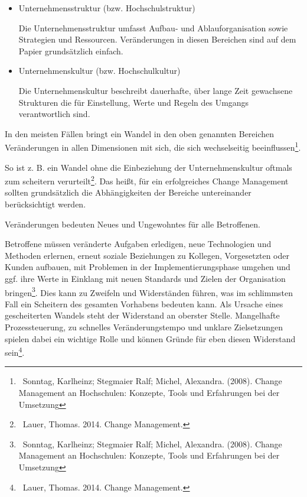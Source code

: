 \documentclass{article}
\begin{document}
\bigskip

\begin{itemize}
\item Unternehmensstruktur (bzw. Hochschulstruktur)

Die Unternehmensstruktur umfasst Aufbau- und Ablauforganisation sowie Strategien und Ressourcen. Veränderungen in diesen
Bereichen sind auf dem Papier grundsätzlich einfach.
\end{itemize}

\bigskip


\bigskip

\begin{itemize}
\item Unternehmenskultur (bzw. Hochschulkultur) 

Die Unternehmenskultur beschreibt dauerhafte, über lange Zeit gewachsene Strukturen die für Einstellung, Werte und
Regeln des Umgangs verantwortlich sind. 


\bigskip
\end{itemize}
In den meisten Fällen bringt ein Wandel in den oben genannten Bereichen Veränderungen in allen Dimensionen mit sich, die
sich wechselseitig beeinflussen\footnote{\ Sonntag, Karlheinz; Stegmaier Ralf; Michel, Alexandra. (2008). Change
Management an Hochschulen: Konzepte, Tools und Erfahrungen bei der Umsetzung}. 

So ist z. B. ein Wandel ohne die Einbeziehung der Unternehmenskultur oftmals zum scheitern verurteilt\footnote{\ Lauer,
Thomas. 2014. Change Management.}. Das heißt, für ein erfolgreiches Change Management sollten grundsätzlich die
Abhängigkeiten der Bereiche untereinander berücksichtigt werden.


\bigskip

Veränderungen bedeuten Neues und Ungewohntes für alle Betroffenen. 

Betroffene müssen veränderte Aufgaben erledigen, neue Technologien und Methoden erlernen, erneut soziale Beziehungen zu
Kollegen, Vorgesetzten oder Kunden aufbauen, mit Problemen in der Implementierungsphase umgehen und ggf. ihre Werte in
Einklang mit neuen Standards und Zielen der Organisation bringen\footnote{\ Sonntag, Karlheinz; Stegmaier Ralf; Michel,
Alexandra. (2008). Change Management an Hochschulen: Konzepte, Tools und Erfahrungen bei der Umsetzung}. Dies kann zu
Zweifeln und Widerständen führen, was im schlimmsten Fall ein Scheitern des gesamten Vorhabens bedeuten kann. Als
Ursache eines gescheiterten Wandels steht der Widerstand an oberster Stelle. Mangelhafte Prozessteuerung, zu schnelles
Veränderungstempo und unklare Zielsetzungen spielen dabei ein wichtige Rolle und können Gründe für eben diesen
Widerstand sein\footnote{\ Lauer, Thomas. 2014. Change Management.}. 
\end{document}
